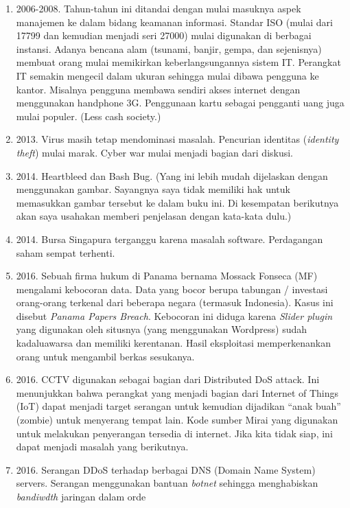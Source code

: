 \begin{enumerate}
\item 2006-2008. Tahun-tahun ini ditandai dengan mulai masuknya
   aspek manajemen ke dalam bidang keamanan informasi.
   Standar ISO (mulai dari 17799 dan kemudian menjadi seri 27000)
   mulai digunakan di berbagai instansi.
   Adanya bencana alam (tsunami, banjir, gempa, dan sejenisnya)
   membuat orang mulai memikirkan keberlangsungannya sistem IT.
   Perangkat IT semakin mengecil dalam ukuran sehingga mulai dibawa
   pengguna ke kantor. Misalnya pengguna membawa sendiri akses
   internet dengan menggunakan handphone 3G.
   Penggunaan kartu sebagai pengganti uang juga mulai populer.
   (Less cash society.)

\item 2013. Virus masih tetap mendominasi masalah.
   Pencurian identitas ({\em identity theft}) mulai marak.
   Cyber war mulai menjadi bagian dari diskusi.
\item 2014. Heartbleed dan Bash Bug.
   (Yang ini lebih mudah dijelaskan dengan menggunakan gambar.
   Sayangnya saya tidak memiliki hak untuk memasukkan gambar tersebut
   ke dalam buku ini. Di kesempatan berikutnya akan saya usahakan
   memberi penjelasan dengan kata-kata dulu.)
\item 2014. Bursa Singapura terganggu karena masalah software.
   Perdagangan saham sempat terhenti.
\item 2016.
   Sebuah firma hukum di Panama bernama Mossack Fonseca (MF)
   mengalami kebocoran data.
   Data yang bocor berupa tabungan / investasi orang-orang terkenal
   dari beberapa negara (termasuk Indonesia).
   Kasus ini disebut {\em Panama Papers Breach}.
   Kebocoran ini diduga karena {\em Slider plugin} yang digunakan
   oleh situsnya (yang menggunakan Wordpress) sudah kadaluawarsa dan
   memiliki kerentanan. Hasil eksploitasi memperkenankan orang untuk
   mengambil berkas sesukanya.
\item 2016. 
   CCTV digunakan sebagai bagian dari Distributed DoS attack.
   Ini menunjukkan bahwa perangkat yang menjadi bagian dari
   Internet of Things (IoT) dapat menjadi target serangan
   untuk kemudian dijadikan ``anak buah'' (zombie) untuk
   menyerang tempat lain.
   Kode sumber Mirai yang digunakan untuk melakukan penyerangan
   tersedia di internet. Jika kita tidak siap, ini dapat menjadi
   masalah yang berikutnya.
\item 2016.
   Serangan DDoS terhadap berbagai DNS (Domain Name System) servers.
   Serangan menggunakan bantuan {\em botnet}
   sehingga menghabiskan {\em bandiwdth} jaringan dalam orde

\end{enumerate}
